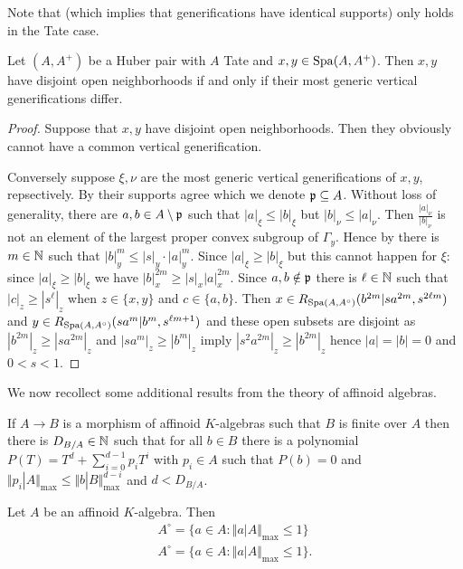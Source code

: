 \begin{remark}
    Note that  (which implies that generifications have identical supports) only holds in the Tate case. 
\end{remark}
\begin{proposition}
    Let $(A,A^{+})$ be a Huber pair with $A$ Tate and $x,y\in\mathrm{Spa}(A,A^{+})$. Then $x,y$ have disjoint open neighborhoods if and only if their most generic vertical generifications differ.
\end{proposition}
\begin{proof}
    Suppose that $x,y$ have disjoint open neighborhoods. Then they obviously cannot have a common vertical generification. 

    Conversely suppose $\xi,\nu$ are the most generic vertical generifications of $x,y$, repsectively. By  their supports agree which we denote $\mathfrak{p}\subseteq A$. Without loss of generality, there are $a,b\in A\setminus\mathfrak{p}$ such that $|a|_{\xi}\leq|b|_{\xi}$ but $|b|_{\nu}\leq |a|_{\nu}$. Then $\frac{|a|_{\nu}}{|b|_{\nu}}$ is not an element of the largest proper convex subgroup of $\Gamma_{y}$. Hence by  there is $m\in\mathbb{N}$ such that $|b|_{y}^{m}\leq |s|_{y}\cdot|a|_{y}^{m}$. Since $|a|_{\xi}\geq|b|_{\xi}$ but this cannot happen for $\xi$: since $|a|_{\xi}\geq |b|_{\xi}$ we have $|b|_{x}^{2m}\geq|s|_{x}|a|^{2m}_{x}$. Since $a,b\notin\mathfrak{p}$ there is $\ell\in\mathbb{N}$ such that $|c|_{z}\geq|s^{\ell}|_{z}$ when $z\in\{x,y\}$ and $c\in \{a,b\}$. Then $x\in R_{\mathrm{Spa}(A,A^{\circ})}(b^{2m}|sa^{2m},s^{2\ell m})$ and $y\in R_{\mathrm{Spa}(A,A^{\circ})}(sa^{m}|b^{m},s^{\ell m+1})$ and these open subsets are disjoint as $|b^{2m}|_{z}\geq|sa^{2m}|_{z}$ and $|sa^{m}|_{z}\geq|b^{m}|_{z}$ imply $|s^{2}a^{2m}|_{z}\geq|b^{2m}|_{z}$ hence $|a|=|b|=0$ and $0<s<1$.
\end{proof}
We now recollect some additional results from the theory of affinoid algebras. 
\begin{proposition}
    If $A\to B$ is a morphism of affinoid $K$-algebras such that $B$ is finite over $A$ then there is $D_{B/A}\in\mathbb{N}$ such that for all $b\in B$ there is a polynomial $P(T)=T^{d}+\sum_{i=0}^{d-1}p_{i}T^{i}$ with $p_{i}\in A$ such that $P(b)=0$ and $\Vert p_{i}|A\Vert_{\max}\leq\Vert b|B\Vert^{d-i}_{\max}$ and $d<D_{B/A}$. 
\end{proposition}
\begin{corollary}
    Let $A$ be an affinoid $K$-algebra. Then 
    \begin{align*}
        A^{\circ}=\{a\in A:\Vert a|A\Vert_{\max}\leq 1\} \\
        A^{\circ}=\{a\in A:\Vert a|A\Vert_{\max}\leq 1\}.
    \end{align*}
\end{corollary}
